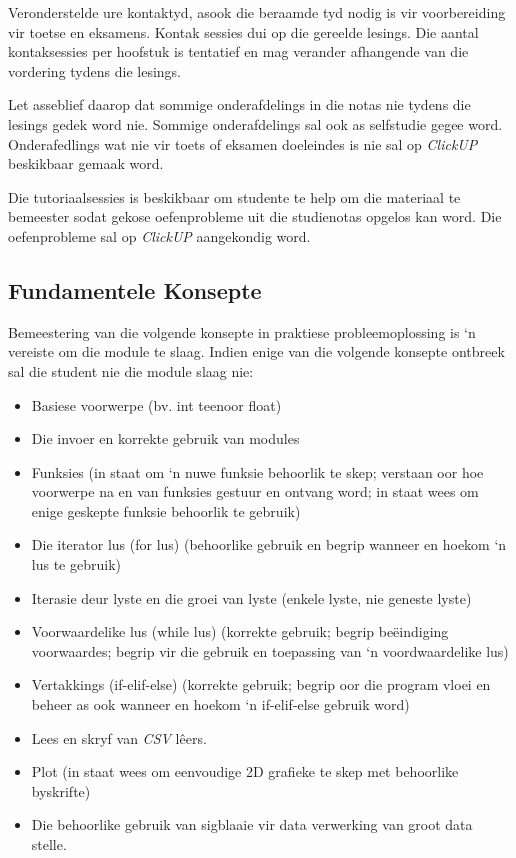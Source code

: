         Veronderstelde ure kontaktyd, asook die beraamde tyd nodig is vir
        voorbereiding vir toetse en eksamens. Kontak sessies dui op die
        gereelde lesings. Die aantal kontaksessies per hoofstuk is tentatief
        en mag verander afhangende van die vordering tydens die lesings.

        Let asseblief daarop dat sommige onderafdelings in die notas nie tydens
        die lesings gedek word nie. Sommige onderafdelings sal ook as
        selfstudie gegee word.  Onderafedlings wat nie vir toets of eksamen
        doeleindes is nie sal op \textit{ClickUP} beskikbaar gemaak word.

        Die tutoriaalsessies is beskikbaar om studente te help om die materiaal
        te bemeester sodat gekose oefenprobleme uit die studienotas opgelos kan
        word. Die oefenprobleme sal op \textit{ClickUP} aangekondig word.

	\subsection{Fundamentele Konsepte}
        Bemeestering van die volgende konsepte in praktiese probleemoplossing
        is `n vereiste om die module te slaag. Indien enige van die volgende
        konsepte ontbreek sal die student nie die module slaag nie:
        \begin{itemize}
            \item Basiese voorwerpe (bv. int teenoor float)
            \item Die invoer en korrekte gebruik van modules
            \item Funksies (in staat om `n nuwe funksie behoorlik te skep;
                verstaan oor hoe voorwerpe na en van funksies gestuur en
                ontvang word; in staat wees om enige geskepte funksie behoorlik
                te gebruik)
            \item Die iterator lus (for  lus) (behoorlike gebruik en begrip
                wanneer en hoekom `n lus te gebruik)
            \item Iterasie deur lyste en die groei van lyste (enkele lyste,
                nie geneste lyste)
            \item Voorwaardelike lus (while lus) (korrekte gebruik; begrip
                be\"eindiging voorwaardes; begrip vir die gebruik en toepassing
                van `n voordwaardelike lus)
            \item Vertakkings (if-elif-else) (korrekte gebruik; begrip oor die
                program vloei en beheer as ook wanneer en hoekom `n
                if-elif-else gebruik word)
            \item Lees en skryf van \emph{CSV} lêers.
            \item Plot (in staat wees om eenvoudige 2D grafieke te skep met
                behoorlike byskrifte)
            \item Die behoorlike gebruik van sigblaaie vir data verwerking van
                groot data stelle.
        \end{itemize}

